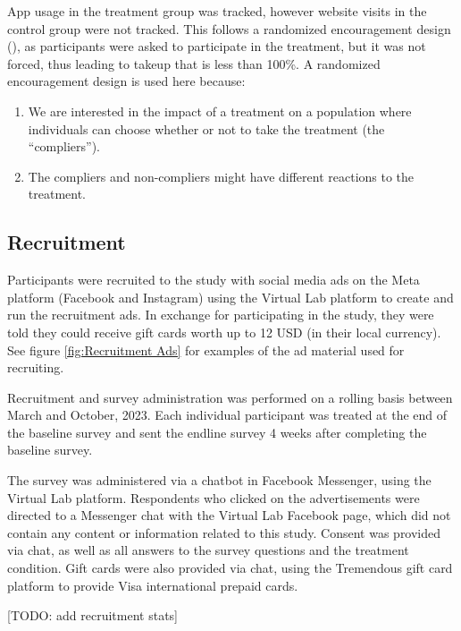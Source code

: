 \message{ !name(bebbo.tex)}\documentclass{article}
\begin{document}
\noindent App usage in the treatment group was tracked, however website visits in the control group were not tracked. This follows a randomized encouragement design (\cite{Moayyedi2014}), as participants were asked to participate in the treatment, but it was not forced, thus leading to takeup that is less than 100\%. A randomized encouragement design is used here because:

\begin{enumerate}
\item We are interested in the impact of a treatment on a population where individuals can choose whether or not to take the treatment (the “compliers”).
\item The compliers and non-compliers might have different reactions to the treatment.
\end{enumerate}







\subsection*{Recruitment}

Participants were recruited to the study with social media ads on the Meta platform (Facebook and Instagram) using the Virtual Lab platform to create and run the recruitment ads. In exchange for participating in the study, they were told they could receive gift cards worth up to 12 USD (in their local currency). See figure \ref{fig:Recruitment Ads} for examples of the ad material used for recruiting.

Recruitment and survey administration was performed on a rolling basis between March and October, 2023. Each individual participant was treated at the end of the baseline survey and sent the endline survey 4 weeks after completing the baseline survey.

The survey was administered via a chatbot in Facebook Messenger, using the Virtual Lab platform. Respondents who clicked on the advertisements were directed to a Messenger chat with the Virtual Lab Facebook page, which did not contain any content or information related to this study. Consent was provided via chat, as well as all answers to the survey questions and the treatment condition. Gift cards were also provided via chat, using the Tremendous gift card platform to provide Visa international prepaid cards.

[TODO: add recruitment stats]
\end{document}

